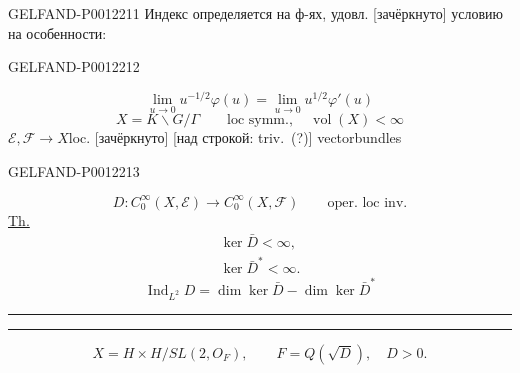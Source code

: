 \begin{GelfandAdjacentEvidence}{GELFAND-P001221}{1}
Индекс определяется на ф-ях, удовл. [зачёркнуто] условию на особенности:
\end{GelfandAdjacentEvidence}
\begin{GelfandAdjacentEvidence}{GELFAND-P001221}{2}

\begin{equation*}
\lim_{u\to0}u^{-1/2}\varphi(u)=\lim_{u\to0}u^{1/2}\varphi'(u)
\end{equation*}
\begin{equation*}
X=K\backslash G/\Gamma\qquad\text{loc symm.},\quad\operatorname{vol}(X)<\infty
\end{equation*}
\(\mathcal E,\mathcal F\longrightarrow X\)\quad loc. [зачёркнуто]
[над строкой: triv.\ (?)] vectorbundles
\end{GelfandAdjacentEvidence}
\begin{GelfandAdjacentEvidence}{GELFAND-P001221}{3}

\begin{equation*}
D:C_0^\infty(X,\mathcal E)\longrightarrow C_0^\infty(X,\mathcal F)
\qquad\text{oper. loc inv.}
\end{equation*}
\underline{Th.}
\begin{equation*}
\begin{gathered}
\ker\bar D<\infty,\\
\ker\bar D^*<\infty.
\end{gathered}
\end{equation*}
\begin{equation*}
\operatorname{Ind}_{L^2}D=\dim\ker\bar D-\dim\ker\bar D^*
\end{equation*}
\begin{center}\rule{.9em}{.35pt}\quad\rule{.9em}{.35pt}\end{center}
\begin{equation*}
X=H\times H/SL(2,O_F),\qquad F=Q(\sqrt D),\quad D>0.
\end{equation*}
\end{GelfandAdjacentEvidence}
